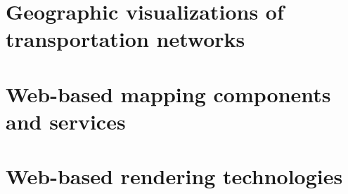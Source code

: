   \section{Geographic visualizations of transportation networks}
    \label{sec:overv:geovs}

  \section{Web-based mapping components and services}
    \label{sec:overv:webmp}

  \section{Web-based rendering technologies}
    \label{sec:overv:webrn}





